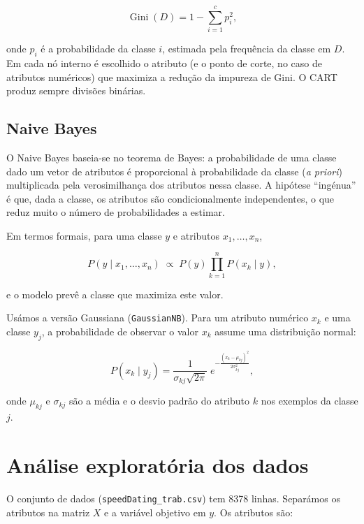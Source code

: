\documentclass[12pt,a4paper]{article}
\newcommand{\code}[1]{\texttt{#1}}
\begin{document}
\[
  \operatorname{Gini}(D) = 1 - \sum_{i=1}^{c} p_i^{2},
\]

onde $p_i$ é a probabilidade da classe $i$, estimada pela frequência da classe em $D$. Em cada nó interno é escolhido o atributo (e o ponto de corte, no caso de atributos numéricos) que maximiza a redução da impureza de Gini. O CART produz sempre divisões binárias.

\subsection{Naive Bayes}

O Naive Bayes baseia-se no teorema de Bayes: a probabilidade de uma classe dado um vetor de atributos é proporcional à probabilidade da classe (\emph{a priori}) multiplicada pela verosimilhança dos atributos nessa classe. A hipótese ``ingénua'' é que, dada a classe, os atributos são condicionalmente independentes, o que reduz muito o número de probabilidades a estimar.

Em termos formais, para uma classe $y$ e atributos $x_1,\dots,x_n$,

\[
  P(y \mid x_1,\dots,x_n) \;\propto\; P(y)\prod_{k=1}^{n} P(x_k \mid y),
\]

e o modelo prevê a classe que maximiza este valor.

Usámos a versão Gaussiana (\code{GaussianNB}). Para um atributo numérico $x_k$ e uma classe $y_j$, a probabilidade de observar o valor $x_k$ assume uma distribuição normal:

\[
  P(x_k \mid y_j) = \frac{1}{\sigma_{kj}\sqrt{2\pi}}\; e^{-\frac{(x_k-\mu_{kj})^2}{2\sigma_{kj}^2}},
\]

onde $\mu_{kj}$ e $\sigma_{kj}$ são a média e o desvio padrão do atributo $k$ nos exemplos da classe $j$.

\clearpage
\section{Análise exploratória dos dados}
\label{sec:dados}

O conjunto de dados (\code{speedDating\_trab.csv}) tem 8378 linhas. Separámos os atributos na matriz $X$ e a variável objetivo em $y$. Os atributos são:
\end{document}
